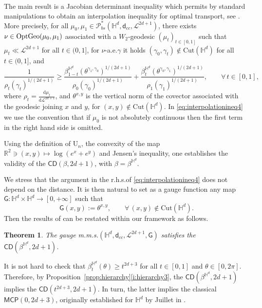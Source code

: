 \documentclass[11pt,a4paper]{article}
\theoremstyle{plain}
\newtheorem{theorem}{Theorem}[section]
\theoremstyle{definition}
\theoremstyle{remark}
\numberwithin{equation}{section}
\newcommand{\R}{\mathbb{R}} %
\renewcommand{\H}{\mathbb{H}}
\newcommand{\Cut}{\mathrm{Cut}}
\newcommand{\CD}{\mathsf{CD}}
\newcommand{\MCP}{\mathsf{MCP}}
\newcommand{\OptGeo}{{\rm OptGeo}}
\newcommand{\U}{\mathrm{U}}
\newcommand{\Prob}{\mathcal{P}}
\newcommand{\di}{\mathrm{d}}
\newcommand{\sfd}{\mathsf d}
\newcommand{\sfG}{\mathsf G}
\begin{document}
The main result \cite[Thm.\@ 1.1]{BKS} is a Jacobian determinant inequality which permits by standard manipulations to obtain an interpolation inequality for optimal transport, see \cite[Eq.\@ (3.17), p.\@ 61]{BKS}. More precisely, for all  $\mu_0,\mu_1\in \Prob_{bs}^{*}(\mathbb{H}^{d},\sfd_{cc},\mathscr{L}^{2d+1})$, there exists $\nu\in\OptGeo(\mu_0,\mu_1)$ associated with a $W_2$-geodesic $(\mu_t)_{t\in [0,1]}$ such that $\mu_t \ll \mathscr{L}^{2d+1}$ for all $t\in (0,1]$, for $\nu$-a.e.\@ $\gamma$ it holds $(\gamma_0, \gamma_t)\notin\Cut(\H^d)$ for all $t\in (0,1]$, and
\begin{equation}\label{eq:interpolationineq4}
\frac{1}{\rho_t(\gamma_t)^{1/(2d+1)}}\geq \frac{\beta^{\H^d}_{1-t}(\theta^{\gamma_1,\gamma_0})^{1/(2d+1)}}{\rho_0(\gamma_0)^{1/(2d+1)}} + \frac{\beta^{\H^d}_t(\theta^{\gamma_0,\gamma_1})^{1/(2d+1)}}{\rho_1(\gamma_1)^{1/(2d+1)}}, \qquad \forall\, t\in [0,1],
\end{equation}
where $\rho_t = \frac{\di \mu_t}{\di \mathscr{L}^{2d+1}}$, and $\theta^{x,y}$ is the vertical norm of the covector associated with the geodesic joining $x$ and $y$, for $(x,y)\notin \mathrm{Cut}(\mathbb{H}^d)$.  In \eqref{eq:interpolationineq4} we use the convention that if $\mu_0$ is not absolutely continuous then the first term in the right hand side is omitted.

Using the definition of $\U_n$, the convexity of the map $\R^{2}\ni(x,y)\mapsto \log(e^{x}+e^{y})$ and Jensen's inequality, one establishes the validity of the $\CD(\beta,2d+1)$, with $\beta=\beta^{\H^d}$.

We stress that the argument in the r.h.s.\@ of \eqref{eq:interpolationineq4} does not depend on the distance. It is then natural to set as a gauge function any map $\sfG:\mathbb{H}^d\times \mathbb{H}^d\to [0,+\infty]$ such that
\begin{equation}
\sfG(x,y):=\theta^{x,y},\qquad \forall\, (x,y)\notin \mathrm{Cut}(\mathbb{H}^d).
\end{equation} 
Then the results of \cite{BKS} can be restated within our framework as follows.
\begin{theorem} \label{t:HeisisCD}
The gauge m.m.s.\@ $(\mathbb{H}^{d},\sfd_{cc},\mathscr{L}^{2d+1},\sfG)$ satisfies the $\CD(\beta^{\H^d},2d+1)$.
\end{theorem}
It is not hard to check that $\beta^{\H^d}_t(\theta) \geq t^{2d+3}$ for all $t\in [0,1]$ and $\theta \in [0,2\pi]$. Therefore, by Proposition~\ref{prop:hierarchy}\ref{i:hierarchy3}, the $\CD(\beta^{\H^d},2d+1)$ implies the $\CD(t^{2d+3},2d+1)$. In turn, the latter implies the classical $\MCP(0,2d+3)$, originally established for $\H^d$ by Juillet in \cite{NJ09}.
\end{document}
